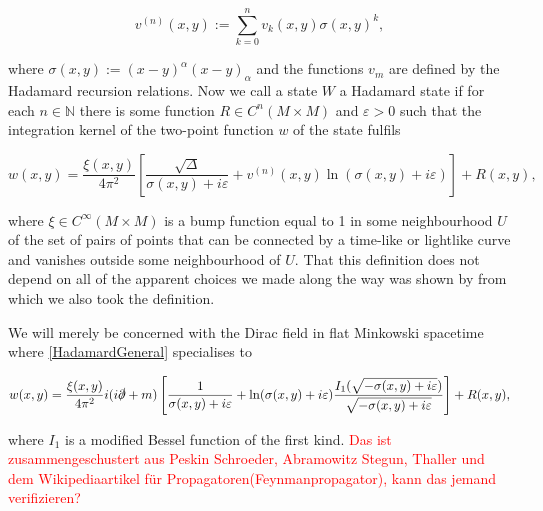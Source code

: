 \documentclass[a4paper,11pt]{article}
\begin{document}
\begin{equation}
v^{(n)}(x,y):= \sum_{k=0}^n v_k(x,y) \sigma(x,y)^k,
\end{equation}

where \(\sigma(x,y):= (x-y)^\alpha (x-y)_\alpha\) and the functions \(v_m\) are defined by the Hadamard recursion relations\cite{DeWitt1960}. 
Now we call a state \(W\) a Hadamard state if for each \(n\in\mathbb{N}\) there is some function \(R\in C^n(M\times M)\) and \(\varepsilon>0\) 
such that the integration kernel of the two-point function \(w\) of the state fulfils


\begin{equation}\label{HadamardGeneral}
w(x,y)=\frac{\xi(x,y)}{4 \pi^2} \left[\frac{\sqrt{\Delta}}{\sigma(x,y)+i\varepsilon} + v^{(n)}(x,y) \ln (\sigma(x,y)+i \varepsilon) \right]
+R(x,y),
\end{equation}

where \(\xi\in C^\infty(M\times M)\) is a bump function equal to 1 in some neighbourhood \(U\) of the set of pairs of points that can be connected 
by a time-like or lightlike curve and vanishes outside some neighbourhood of \(U\). That this definition does not 
depend on all of the apparent choices we made along the way was shown 
by \cite{kay1991theorems} from which we also took the definition. 

We will merely be concerned with the Dirac field in flat Minkowski spacetime where \eqref{HadamardGeneral} specialises to

\begin{equation}
w(x,y)=\frac{\xi(x,y)}{4 \pi^2} i(i\slashed{\partial} + m) \left[\frac{1}{\sigma(x,y)+i \varepsilon} +  \ln (\sigma(x,y)+i \varepsilon) \frac{I_1(\sqrt{-\sigma(x,y)+i \varepsilon})}{\sqrt{-\sigma(x,y)+i \varepsilon}} \right]
+R(x,y),
\end{equation}

where  \(I_1\) is a modified Bessel function of the first kind. \textcolor{red}{Das ist zusammengeschustert aus Peskin Schroeder, Abramowitz Stegun, Thaller und dem Wikipediaartikel für Propagatoren(Feynmanpropagator), kann das jemand verifizieren?}


\end{document}
